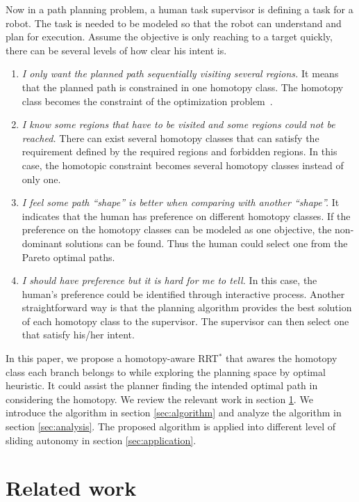 \documentclass[letterpaper, 10 pt, conference]{ieeeconf}
\begin{document}
Now in a path planning problem, a human task supervisor is defining a task for a robot.
The task is needed to be modeled so that the robot can understand and plan for execution.
Assume the objective is only reaching to a target quickly, there can be several levels of how clear his intent is.
\begin{enumerate}
\item \emph{I only want the planned path sequentially visiting several regions.}
It means that the planned path is constrained in one homotopy class.
The homotopy class becomes the constraint of the optimization problem~\cite{Hershberger199463}.
\item \emph{I know some regions that have to be visited and some regions could not be reached.}
There can exist several homotopy classes that can satisfy the requirement defined by the required regions and forbidden regions.
In this case, the homotopic constraint becomes several homotopy classes instead of only one.
\item \emph{I feel some path ``shape'' is better when comparing with another ``shape''.}
It indicates that the human has preference on different homotopy classes.
If the preference on the homotopy classes can be modeled as one objective, the non-dominant solutions can be found.
Thus the human could select one from the Pareto optimal paths.
\item \emph{I should have preference but it is hard for me to tell.}
In this case, the human's preference could be identified through interactive process.
Another straightforward way is that the planning algorithm provides the best solution of each homotopy class to the supervisor.
The supervisor can then select one that satisfy his/her intent.
\end{enumerate}

In this paper, we propose a homotopy-aware RRT$^{*}$ that awares the homotopy class each branch belongs to while exploring the planning space by optimal heuristic.
It could assist the planner finding the intended optimal path in considering the homotopy.
We review the relevant work in section \ref{sec:related_work}.
We introduce the algorithm in section \ref{sec:algorithm} and analyze the algorithm in section \ref{sec:analysis}.
The proposed algorithm is applied into different level of sliding autonomy in section \ref{sec:application}.

\section{Related work}
\label{sec:related_work}
\end{document}
